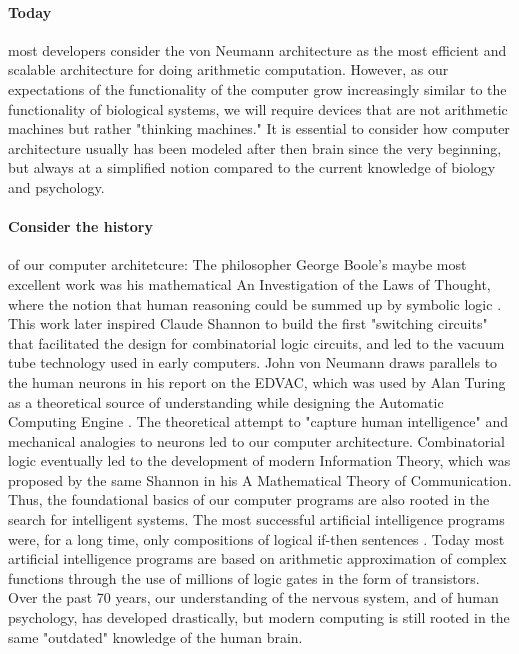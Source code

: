 \paragraph{Today} most developers consider the von Neumann architecture as the most efficient and scalable architecture for doing arithmetic computation.
However, as our expectations of the functionality of the computer grow increasingly similar to the functionality of biological systems, we will require devices that are not arithmetic machines but rather "thinking machines."
It is essential to consider how computer architecture usually has been modeled after then brain since the very beginning, but always at a simplified notion compared to the current knowledge of biology and psychology.

\paragraph{Consider the history} of our computer architetcure:
The philosopher George Boole's maybe most excellent work was his mathematical An Investigation of the Laws of Thought, where the notion that human reasoning could be summed up by symbolic logic \cite{boole_investigation_1854}.
This work later inspired Claude Shannon to build the first "switching circuits" that facilitated the design for combinatorial logic circuits, and led to the vacuum tube technology used in early computers.
John von Neumann draws parallels to the human neurons in his report on the EDVAC, which was used by Alan Turing as a theoretical source of understanding while designing the Automatic Computing Engine \cite{von_neumann_first_1993}.
The theoretical attempt to "capture human intelligence" and mechanical analogies to neurons led to our computer architecture.
Combinatorial logic eventually led to the development of modern Information Theory, which was proposed by the same Shannon in his A Mathematical Theory of Communication.
Thus, the foundational basics of our computer programs are also rooted in the search for intelligent systems.
The most successful artificial intelligence programs were, for a long time, only compositions of logical if-then sentences \cite{haenlein_brief_2019}.
Today most artificial intelligence programs are based on arithmetic approximation of complex functions through the use of millions of logic gates in the form of transistors.
Over the past 70 years, our understanding of the nervous system, and of human psychology, has developed drastically, but modern computing is still rooted in the same "outdated" knowledge of the human brain.

